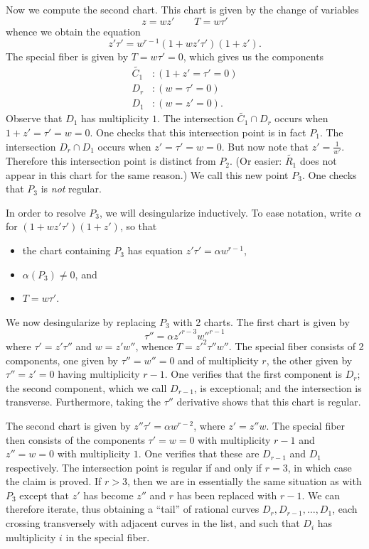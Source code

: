 \documentclass[reqno]{amsart}
\theoremstyle{definition}
\theoremstyle{remark}
\begin{document}
Now we compute the second chart. This chart is given by the change of variables
\[
z=wz' \qquad T=w\tau'
\]
whence we obtain the equation
\[
z'\tau' = w^{r-1}(1 + wz'\tau')(1 + z').
\]
The special fiber is given by $T = w\tau' = 0$, which gives us the components
\begin{align*}
  \tilde{C_1}&: (1 + z' = \tau' = 0) \\
  D_r&: (w = \tau' = 0) \\
  D_1&: (w = z' = 0).
\end{align*}
Observe that $D_1$ has multiplicity $1$. The intersection $\tilde{C_1} \cap D_r$ occurs when $1 + z' = \tau' = w = 0$. One checks that this intersection point is in fact $P_1$. The intersection $D_r \cap D_1$ occurs when $z' = \tau' = w = 0$. But now note that $z' = \frac{1}{w'}$. Therefore this intersection point is distinct from $P_2$. (Or easier: $\tilde{R_1}$ does not appear in this chart for the same reason.) We call this new point $P_3$. One checks that $P_3$ is \emph{not} regular.

In order to resolve $P_3$, we will desingularize inductively. To ease notation, write $\alpha$ for $(1 + wz'\tau')(1 + z')$, so that
\begin{itemize}
    \item the chart containing $P_3$ has equation $z'\tau' = \alpha w^{r-1}$,
    \item $\alpha(P_3) \neq 0$, and
    \item $T = w\tau'$.
\end{itemize}

We now desingularize by replacing $P_3$ with 2 charts. The first chart is given by
\[
\tau'' = \alpha z'^{r-3} w''^{r-1}
\]
where $\tau' = z' \tau''$ and $w = z' w''$, whence $T = z'^2 \tau'' w''$. The special fiber consists of 2 components, one given by $\tau'' = w'' = 0$ and of multiplicity $r$, the other given by $\tau'' = z' = 0$ having multiplicity $r-1$. One verifies that the first component is $D_r$; the second component, which we call $D_{r-1}$, is exceptional; and the intersection is transverse. Furthermore, taking the $\tau''$ derivative shows that this chart is regular.

  The second chart is given by $z'' \tau' = \alpha w^{r-2}$, where $z' = z'' w$. The special fiber then consists of the components $\tau' = w = 0$ with multiplicity $r-1$ and $z'' = w = 0$ with multiplicity $1$. One verifies that these are $D_{r-1}$ and $D_1$ respectively. The intersection point is regular if and only if $r = 3$, in which case the claim is proved. If $r > 3$, then we are in essentially the same situation as with $P_3$ except that $z'$ has become $z''$ and $r$ has been replaced with $r-1$. We can therefore iterate, thus obtaining a ``tail'' of rational curves $D_r, D_{r-1}, \dots, D_1$, each crossing transversely with adjacent curves in the list, and such that $D_i$ has multiplicity $i$ in the special fiber.
\end{document}
